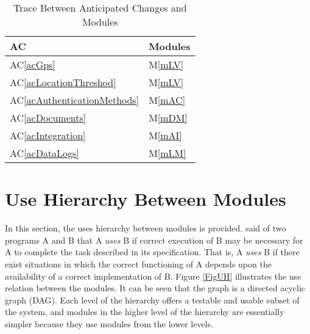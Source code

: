 \documentclass[12pt, titlepage]{article}
\newcommand{\acref}[1]{AC\ref{#1}}
\newcommand{\mref}[1]{M\ref{#1}}
\begin{document}
\begin{table}[H]
  \centering
  \begin{tabular}{p{} p{}}
    \toprule
    \textbf{AC}                        & \textbf{Modules} \\
    \midrule
    \acref{acGps}                      & \mref{mLV} \\
    \acref{acLocationThreshod}         & \mref{mLV} \\
    \acref{acAuthenticationMethods}    & \mref{mAC} \\
    \acref{acDocuments}                & \mref{mDM} \\
    \acref{acIntegration}              & \mref{mAI} \\
    \acref{acDataLogs}                 & \mref{mLM} \\
    \bottomrule
  \end{tabular}
  \caption{Trace Between Anticipated Changes and Modules}
  \label{TblACT}
\end{table}

\section{Use Hierarchy Between Modules} \label{SecUse}

In this section, the uses hierarchy between modules is
provided. \citet{Parnas1978} said of two programs A and B that A {\em uses} B if
correct execution of B may be necessary for A to complete the task described in
its specification. That is, A {\em uses} B if there exist situations in which
the correct functioning of A depends upon the availability of a correct
implementation of B.  Figure \ref{FigUH} illustrates the use relation between
the modules. It can be seen that the graph is a directed acyclic graph
(DAG). Each level of the hierarchy offers a testable and usable subset of the
system, and modules in the higher level of the hierarchy are essentially simpler
because they use modules from the lower levels.

\end{document}
